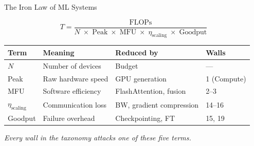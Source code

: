 \documentclass[aspectratio=169, 12pt]{beamer}
\begin{document}
\begin{frame}[shrink]{The Iron Law of ML Systems}

\[
T = \frac{\text{FLOPs}}{N \;\times\; \text{Peak} \;\times\; \text{MFU}
  \;\times\; \eta_{\text{scaling}} \;\times\; \text{Goodput}}
\]

\vspace{0.3cm}
\small
\begin{tabular}{llll}
\toprule
\textbf{Term} & \textbf{Meaning} & \textbf{Reduced by} & \textbf{Walls} \\
\midrule
$N$ & Number of devices & Budget & --- \\
Peak & Raw hardware speed & GPU generation & 1 (Compute) \\
MFU & Software efficiency & FlashAttention, fusion & 2--3 \\
$\eta_{\text{scaling}}$ & Communication loss & BW, gradient compression & 14--16 \\
Goodput & Failure overhead & Checkpointing, FT & 15, 19 \\
\bottomrule
\end{tabular}

\vspace{0.3cm}
\centering
\textit{Every wall in the taxonomy attacks one of these five terms.}
\end{frame}
\end{document}
